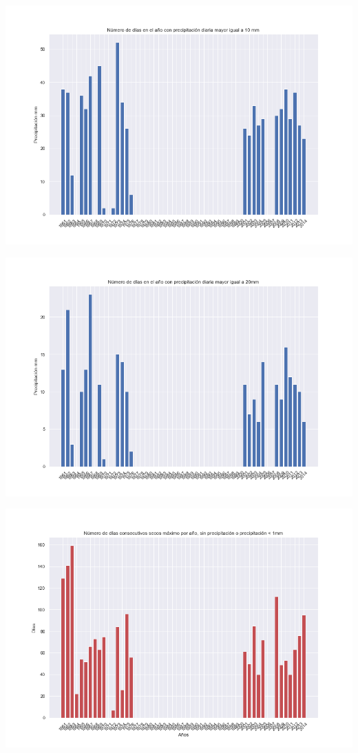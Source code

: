\documentclass[12pt]{article}
\begin{document}
\begin{center}
\includegraphics[scale=0.5]{R10mm.png}
\end{center} 
\begin{center}
\includegraphics[scale=0.5]{R20mm.png}
\end{center} 
\begin{center}
\includegraphics[scale=0.5]{CDD.png}
\end{center} 
\end{document}
